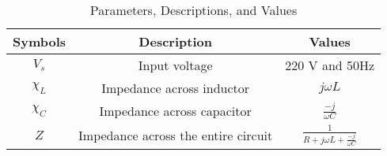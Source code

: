 \begin{table}[ht!]
\centering
\begin{tabular}{ |c|c|c| } 
 \hline
Symbols & Description & Values  \\
\hline
 $V_s$ & Input voltage & 220 V and 50Hz\\
 \hline
 $\chi_L$ & Impedance across inductor & $j\omega L$\\
 \hline
 $\chi_C$ & Impedance across capacitor & $\frac{-j}{\omega C}$\\
 \hline
 $Z$& Impedance across the entire circuit & $\frac{1}{R+j\omega L +\frac{-j}{\omega C}}$\\
 \hline
\end{tabular}
\caption{Parameters, Descriptions, and Values}
\label{table:ee25-bm54-gate2022}
\end{table}



